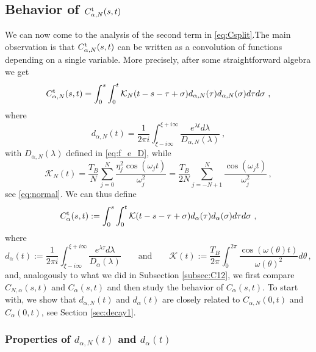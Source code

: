 \documentclass[11pt]{article}
\numberwithin{equation}{section}
\numberwithin{theorem}{section}
\newcommand{\matht}[1]{\texorpdfstring{#1}{}}
\begin{document}
\subsection{Behavior of \matht{$C^{\rm t}_{\alpha,N}(s,t)$}}\label{subsec:C22}

We can now come to the analysis of the second term in \eqref{eq:Csplit}.The main observation is that $C^{\rm 
t}_{\alpha,N}(s,t)$ can be written as a convolution of functions depending on a single variable. More precisely, after 
some straightforward algebra we get
\begin{equation}\label{eq:expCt}
C^{\rm t}_{\alpha,N}(s,t)=\int_0^s\int_0^t {\mathcal K_N}(t-s-\tau+\sigma)d_{\alpha,N}(\tau)d_{\alpha,N}(\sigma)d\tau
d\sigma\ ,
\end{equation}
where
\[
d_{\alpha,N}(t)= \frac{1}{2\pi
  i}\int_{\xi-i\infty}^{\xi+i\infty}\frac{ e^{\lambda t}
  d\lambda}{D_{\alpha,N}(\lambda)}\ ,
\]
with $D_{\alpha,N}(\lambda)$ defined in \eqref{eq:f_e_D}, while
\[
{\mathcal K}_N(t)=\frac{T_B}{N}\sum_{j=0}^N 
\frac{\eta_j^2\cos(\omega_jt)}{\omega_j^2}=\frac{T_B}{2N}\sum_{j=-N+1}^N
\frac{\cos(\omega_jt)}{\omega_j^2}\, ,
\]
see \eqref{eq:normal}. We can thus define
\begin{equation}\label{eq:calK}
 C^{\rm t}_{\alpha}(s,t):=\int_0^s\int_0^t {\mathcal
   K}(t-s-\tau+\sigma)d_{\alpha}(\tau)d_{\alpha}(\sigma)d\tau
 d\sigma\ ,
\end{equation}
where
\begin{equation}\label{eq:def-d-K}
 d_{\alpha}(t):= \frac{1}{2\pi i}\int_{\xi-i\infty}^{\xi+i\infty}\frac{ e^{\lambda \tau} d\lambda}{D_{\alpha}(\lambda)}
\qquad\mathrm{and}\qquad {\mathcal K}(t):=\frac{T_B}{2\pi}\int_0^{2\pi}
\frac{\cos(\omega(\theta)t)}{\omega(\theta)^2}d\theta\, ,
\end{equation}
and, analogously to what we did in Subsection \ref{subsec:C12}, we first compare $C_{N,\alpha}(s,t)$ and $C_\alpha(s,t)$
and then study the behavior of $C_\alpha(s,t)$. To start with, we show that $d_{\alpha,N}(t)$ and $d_\alpha(t)$ are 
closely related to $C_{\alpha,N}(0,t)$ and  $C_{\alpha}(0,t)$, see Section \ref{sec:decay1}.

\subsubsection{Properties of \matht{$d_{\alpha,N}(t)$ and $d_\alpha(t)$}}
\label{subsec:dalpha}
	
\end{document}

